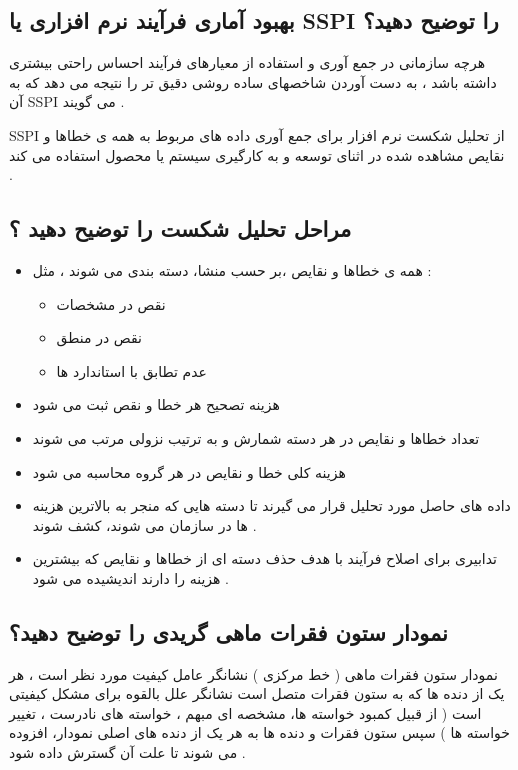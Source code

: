 \documentclass{article}
\begin{document}
\subsection{بهبود آماری فرآیند نرم افزاری یا SSPI را توضیح دهید؟}
هرچه سازمانی در جمع آوری و استفاده از معیارهای فرآیند احساس راحتی بیشتری داشته باشد ، به دست آوردن شاخصهای ساده روشی دقیق تر را نتیجه می دهد که به آن SSPI می گویند .

SSPI از تحلیل شکست نرم افزار برای جمع آوری داده های مربوط به همه ی خطاها و نقایص مشاهده شده در اثنای  توسعه و به کارگیری سیستم یا محصول استفاده می کند .



\subsection{مراحل تحلیل شکست را توضیح دهید ؟}


\begin{itemize}
	\item همه ی خطاها و نقایص ،بر حسب منشا، دسته بندی می شوند ، مثل : 
	\begin{itemize}
		\item نقص در مشخصات
		\item  نقص در منطق
		\item عدم تطابق با استاندارد ها
	\end{itemize}
	\item هزینه تصحیح هر خطا و نقص ثبت می شود
	\item تعداد خطاها و نقایص در هر دسته شمارش و به ترتیب نزولی مرتب می شوند
	\item هزینه کلی خطا و نقایص در هر گروه محاسبه می شود
	\item داده های حاصل مورد تحلیل قرار می گیرند تا دسته هایی که منجر به بالاترین هزینه ها در سازمان می شوند، کشف شوند .
	\item تدابیری برای اصلاح فرآیند با هدف حذف دسته ای از خطاها و نقایص که بیشترین هزینه را دارند اندیشیده می شود .
\end{itemize}




\subsection{نمودار ستون فقرات ماهی گریدی را توضیح دهید؟}


نمودار ستون فقرات ماهی ( خط مرکزی ) نشانگر عامل کیفیت مورد نظر است ، هر یک از دنده ها که به ستون فقرات متصل است نشانگر علل بالقوه برای مشکل کیفیتی است ( از قبیل کمبود خواسته ها، مشخصه ای مبهم ، خواسته های نادرست ، تغییر خواسته ها ) سپس ستون فقرات و دنده ها به هر یک از دنده های اصلی نمودار، افزوده می شوند تا علت آن گسترش داده شود .
\end{document}
